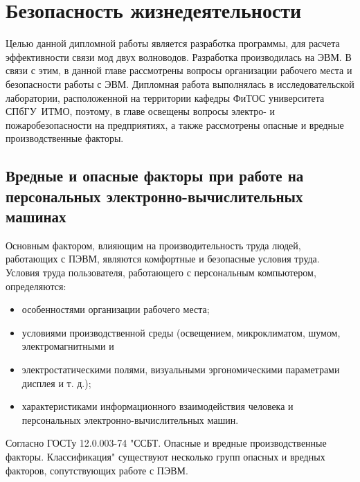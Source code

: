 \chapter{Безопасность жизнедеятельности}

Целью данной дипломной работы является разработка программы, для расчета эффективности связи мод двух волноводов. Разработка производилась на ЭВМ. В связи с этим, в данной главе рассмотрены вопросы организации рабочего места и безопасности работы с ЭВМ. Дипломная работа выполнялась в исследовательской лаборатории, расположенной на территории кафедры ФиТОС университета СПбГУ~ИТМО, поэтому, в главе освещены вопросы электро- и пожаробезопасности на предприятиях, а также рассмотрены опасные и вредные производственные факторы.

\section{Вредные и опасные факторы при работе на персональных электронно-вычислительных машинах}

Основным фактором, влияющим на производительность труда людей, работающих с ПЭВМ, являются комфортные и безопасные условия труда. Условия труда пользователя, работающего с персональным компьютером, определяются:
\begin{itemize}
	\item особенностями организации рабочего места;
	\item условиями производственной среды (освещением, микроклиматом, шумом, электромагнитными и 			\item электростатическими полями, визуальными эргономическими параметрами дисплея и т. д.);
	\item характеристиками информационного взаимодействия человека и персональных электронно-вычислительных машин.
\end{itemize}

Согласно ГОСТу 12.0.003-74 "ССБТ. Опасные и вредные производственные факторы. Классификация" существуют несколько групп опасных и вредных факторов, сопутствующих работе с ПЭВМ.

